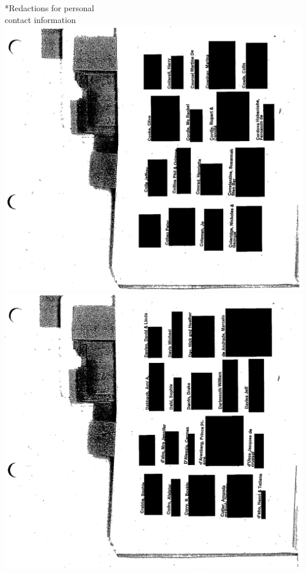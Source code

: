 \documentclass[10pt]{article}
\begin{document}
*Redactions for personal\\
contact information\\
\includegraphics[max width=\textwidth, center]{2025_02_27_dd68c3d38de88f0516d9g-134}\\
\includegraphics[max width=\textwidth, center]{2025_02_27_dd68c3d38de88f0516d9g-135}\\
\end{document}
